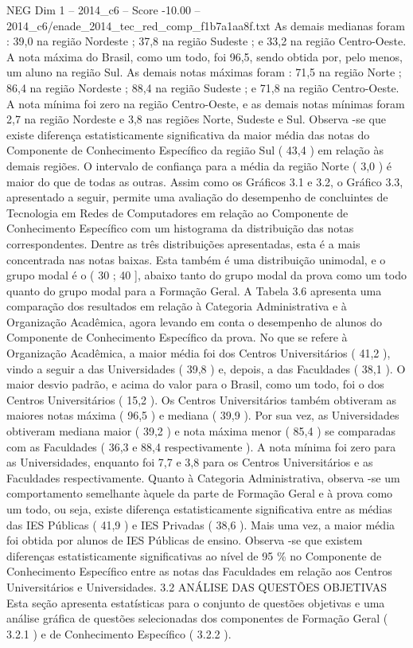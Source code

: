 \begin{textsample}{NEG Dim 1 – 2014\_c6 – Score -10.00 – 2014\_c6/enade\_2014\_tec\_red\_comp\_f1b7a1aa8f.txt}
As demais medianas foram : 39,0 na região Nordeste ; 37,8 na região Sudeste ; e 33,2 na região Centro-Oeste.
A nota máxima do Brasil, como um todo, foi 96,5, sendo obtida por, pelo menos, um aluno na região Sul.
As demais notas máximas foram : 71,5 na região Norte ; 86,4 na região Nordeste ; 88,4 na região Sudeste ; e 71,8 na região Centro-Oeste.
A nota mínima foi zero na região Centro-Oeste, e as demais notas mínimas foram 2,7 na região Nordeste e 3,8 nas regiões Norte, Sudeste e Sul.
Observa -se que existe diferença estatisticamente significativa da maior média das notas do Componente de Conhecimento Específico da região Sul ( 43,4 ) em relação às demais regiões.
O intervalo de confiança para a média da região Norte ( 3,0 ) é maior do que de todas as outras.
Assim como os Gráficos 3.1 e 3.2, o Gráfico 3.3, apresentado a seguir, permite uma avaliação do desempenho de concluintes de Tecnologia em Redes de Computadores em relação ao Componente de Conhecimento Específico com um histograma da distribuição das notas correspondentes.
Dentre as três distribuições apresentadas, esta é a mais concentrada nas notas baixas.
Esta também é uma distribuição unimodal, e o grupo modal é o ( 30 ; 40 ], abaixo tanto do grupo modal da prova como um todo quanto do grupo modal para a Formação Geral.
A Tabela 3.6 apresenta uma comparação dos resultados em relação à Categoria Administrativa e à Organização Acadêmica, agora levando em conta o desempenho de alunos do Componente de Conhecimento Específico da prova.
No que se refere à Organização Acadêmica, a maior média foi dos Centros Universitários ( 41,2 ), vindo a seguir a das Universidades ( 39,8 ) e, depois, a das Faculdades ( 38,1 ).
O maior desvio padrão, e acima do valor para o Brasil, como um todo, foi o dos Centros Universitários ( 15,2 ).
Os Centros Universitários também obtiveram as maiores notas máxima ( 96,5 ) e mediana ( 39,9 ).
Por sua vez, as Universidades obtiveram mediana maior ( 39,2 ) e nota máxima menor ( 85,4 ) se comparadas com as Faculdades ( 36,3 e 88,4 respectivamente ).
A nota mínima foi zero para as Universidades, enquanto foi 7,7 e 3,8 para os Centros Universitários e as Faculdades respectivamente.
Quanto à Categoria Administrativa, observa -se um comportamento semelhante àquele da parte de Formação Geral e à prova como um todo, ou seja, existe diferença estatisticamente significativa entre as médias das IES Públicas ( 41,9 ) e IES Privadas ( 38,6 ).
Mais uma vez, a maior média foi obtida por alunos de IES Públicas de ensino.
Observa -se que existem diferenças estatisticamente significativas ao nível de 95 \% no Componente de Conhecimento Específico entre as notas das Faculdades em relação aos Centros Universitários e Universidades. 3.2 ANÁLISE DAS QUESTÕES OBJETIVAS Esta seção apresenta estatísticas para o conjunto de questões objetivas e uma análise gráfica de questões selecionadas dos componentes de Formação Geral ( 3.2.1 ) e de Conhecimento Específico ( 3.2.2 ).

\end{textsample}
